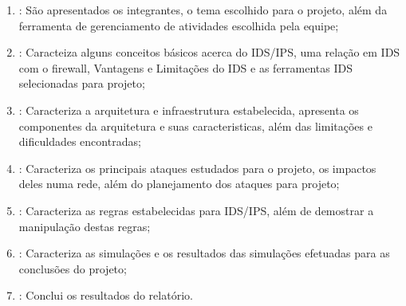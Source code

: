 		\begin{enumerate}
		\item{\textbf{}: São apresentados os integrantes, o tema escolhido para o projeto, além da ferramenta de gerenciamento de atividades escolhida pela equipe;}
		\item{\textbf{}: Caracteiza alguns conceitos básicos acerca do IDS/IPS, uma relação em IDS com o firewall, Vantagens e Limitações do IDS e as ferramentas IDS selecionadas para projeto;}
		\item{\textbf{}: Caracteriza a arquitetura e infraestrutura estabelecida, apresenta os componentes da arquitetura e suas caracteristicas, além das limitações e dificuldades encontradas;}
		\item{\textbf{}: Caracteriza os principais ataques estudados para o projeto, os impactos deles numa rede, além do planejamento dos ataques para projeto;}
		\item{\textbf{}: Caracteriza as regras estabelecidas para IDS/IPS, além de demostrar a manipulação destas regras;}
		\item{\textbf{}: Caracteriza as simulações e os resultados das simulações efetuadas para as conclusões do projeto;}
		\item{\textbf{}: Conclui os resultados do relatório.}
	\end{enumerate}